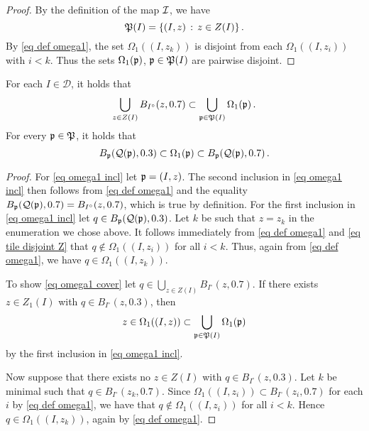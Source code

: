 \begin{proof}
    By the definition of the map $\sc$, we have
    $$
        \fP(I) = \{(I, z) \, : \, z \in Z(I)\}\,.
    $$
    By \eqref{eq def omega1}, the set $\Omega_1((I, z_k))$ is disjoint from each $\Omega_1((I, z_i))$ with $i < k$. Thus the sets $\Omega_1(\fp)$, $\fp \in \fP(I)$ are pairwise disjoint.
\end{proof}

\begin{lemma}
    For each $I \in \mathcal{D}$, it holds that
    \begin{equation}
    \label{eq omega1 cover}
         \bigcup_{z \in Z(I)} B_{I^\circ}(z, 0.7)\subset \bigcup_{\fp \in \fP(I)} \Omega_1(\fp)\,.
    \end{equation}
    For every $\fp \in \fP$, it holds that
    \begin{equation}
        \label{eq omega1 incl}
        B_{\fp}(\fcc(\fp), 0.3) \subset \Omega_1(\fp) \subset B_{\fp}(\fcc(\fp), 0.7)\,.
    \end{equation}
\end{lemma}

\begin{proof}
    For \eqref{eq omega1 incl} let $\fp = (I, z)$.
    The second inclusion in \eqref{eq omega1 incl} then follows from \eqref{eq def omega1} and the equality $B_{\fp}(\fcc(\fp), 0.7) = B_{I^\circ}(z, 0.7)$, which is true by definition.
    For the first inclusion in \eqref{eq omega1 incl} let $q \in B_{\fp}(\fcc(\fp),0.3)$. Let $k$ be such that $z = z_k$ in the enumeration we chose above. It follows immediately from \eqref{eq def omega1} and \eqref{eq tile disjoint Z} that
    $q \notin \Omega_1((I, z_i))$ for all $i < k$. Thus, again from \eqref{eq def omega1}, we have
    $q \in \Omega_1((I,z_k))$.

    To show \eqref{eq omega1 cover} let $q \in \bigcup_{z \in Z(I)} B_{I^\circ}(z,0.7)$.
    If there exists $z \in Z_1(I)$ with $q \in B_{I^\circ}(z,0.3)$, then
    $$
        z \in \Omega_1((I, z)) \subset \bigcup_{\fp \in \fP(I)} \Omega_1(\fp)
    $$
    by the first inclusion in \eqref{eq omega1 incl}.

    Now suppose that there exists no $z \in Z(I)$ with $q \in B_{I^\circ}(z, 0.3)$. Let $k$ be minimal such that $q \in B_{I^\circ}(z_k, 0.7)$. Since $\Omega_1((I, z_i)) \subset B_{I^\circ}(z_i, 0.7)$ for each $i$ by \eqref{eq def omega1}, we have that $q \notin \Omega_1((I, z_i))$ for all $i < k$. Hence $q \in \Omega_1((I, z_k))$, again by \eqref{eq def omega1}.
\end{proof}

